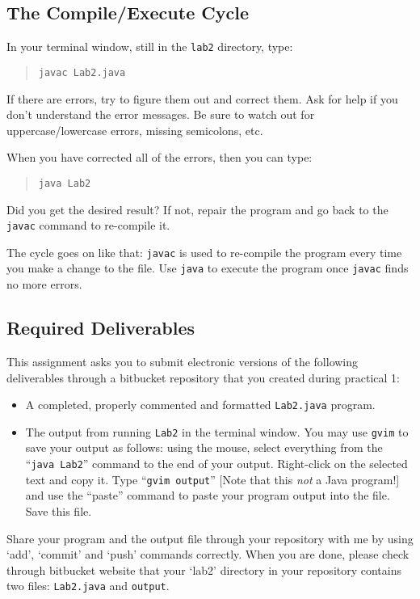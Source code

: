 \subsection*{The Compile/Execute Cycle}
In your terminal window, still in the {\tt lab2} directory, type:

\vspace*{-.1in}
\begin{quote}
{\tt javac Lab2.java} 
\end{quote}
\vspace*{-.1in}

If there are errors, try to figure them out and correct them. Ask for help if
you don't understand the error messages. Be sure to watch out for
uppercase/lowercase errors, missing semicolons, etc.

When you have corrected all of the errors, then you can type:

\vspace*{-.1in}
\begin{quote}
{\tt java Lab2}
\end{quote}
\vspace*{-.1in}

Did you get the desired result? If not, repair the program and go back to
the {\tt javac} command to re-compile it.

The cycle goes on like that: {\tt javac} is used to re-compile the
program every time you make a change
to the file. Use {\tt java} to execute the program once {\tt javac}
finds no more errors.

\subsection*{Required Deliverables}
This assignment asks you to submit electronic versions of the following deliverables through
a bitbucket repository that you created during practical 1: 
\begin{itemize}
	\item A completed, properly commented and formatted {\tt Lab2.java} program.
	\item The output from running {\tt Lab2} in the terminal window. You may use {\tt gvim} to save
	your output as follows: using the mouse,
select everything from the ``{\tt java Lab2}'' command to the end of your output.
Right-click on the selected text and copy it.
Type ``{\tt gvim output}'' [Note that this {\em not} a Java program!]
and use the ``paste'' command to paste your program output into the file.
 Save this file.
\end{itemize}

Share your program and the output file through your repository with me by using `add', `commit' and `push' commands correctly. When you are done, please check through bitbucket website that your `lab2' directory in your repository contains two files: {\tt Lab2.java} and {\tt output}.


